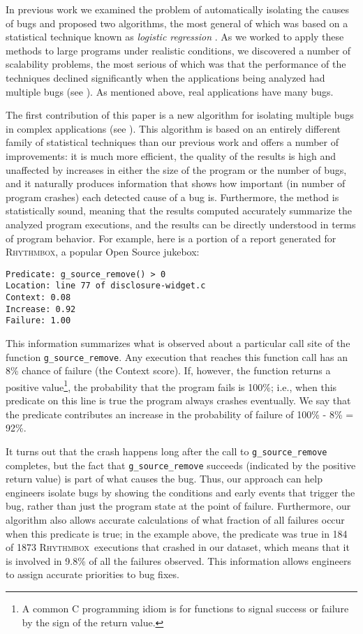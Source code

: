 \documentclass[draft]{sig-alternate}
\newcommand{\rhythmbox}{\textsc{Rhythmbox}\xspace}
\begin{document}
In previous work we examined the problem of automatically isolating
the causes of bugs and proposed two algorithms, the most general of
which was based on a statistical technique known as {\em logistic
regression} \cite{PLDI`03*141,Zheng:2003:SDSP}.  As we worked to apply
these methods to large programs under realistic conditions, we
discovered a number of scalability problems, the most serious of which
was that the performance of the techniques declined significantly 
when the applications being analyzed had multiple bugs (see
).  As mentioned above, real applications
have many bugs.

The first contribution of this paper is a new algorithm for isolating
multiple bugs in complex applications (see ).  This algorithm 
is based on an entirely different family of statistical techniques than our previous work and offers
a number of improvements:
it is much more efficient, the quality of the
results is high and unaffected by increases in either the size of the program
or the number of bugs, and it naturally produces information
that shows how important (in number of program crashes) each detected
cause of a bug is.  Furthermore, the method is statistically sound, meaning that
the results computed accurately summarize the analyzed program 
executions, and the results can be directly understood in terms of program behavior.
For example, here is a portion of a report generated for \rhythmbox,
a popular Open Source jukebox:
\begin{verbatim}
Predicate: g_source_remove() > 0 
Location: line 77 of disclosure-widget.c
Context: 0.08
Increase: 0.92   
Failure: 1.00   
\end{verbatim}
This information summarizes what is observed about a particular call site of the function {\tt g\_source\_remove}.
Any execution that reaches this function call has an 8\% chance of failure (the Context score).  If, however,
the function returns a
positive value\footnote{A common C programming idiom is for functions to signal success or failure by the sign of the return value.}, the probability that the program fails is 100\%; i.e., when this predicate on this line is true the program always crashes eventually.  We say that the predicate contributes an increase in the probability of failure of 100\% - 8\% = 92\%.

It turns out that the crash happens long after the call to {\tt g\_source\_remove} completes,
but the fact that {\tt g\_source\_remove} succeeds (indicated by the positive return value) is part of what causes the bug.  Thus,
our approach can help engineers isolate bugs by showing the conditions and early events that trigger the bug, rather than just the
program state at the point of failure.  Furthermore, our algorithm also allows accurate calculations of what fraction of all failures occur when this predicate
is true; in the example above, the predicate was true in 184 of 1873 \rhythmbox\ executions that crashed in our dataset, which means that
it is involved in 9.8\% of all the failures observed.  This information allows engineers to assign accurate priorities to bug fixes.
\end{document}
